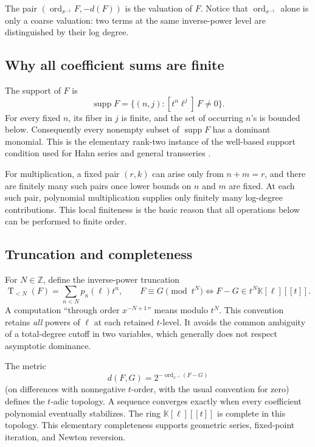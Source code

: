 \documentclass[11pt,oneside]{article}
\numberwithin{equation}{section}
\theoremstyle{definition}
\newcommand{\K}{\mathbb K}
\newcommand{\Z}{\mathbb Z}
\newcommand{\ordx}{\operatorname{ord}_{x^{-1}}}
\newcommand{\supp}{\operatorname{supp}}
\newcommand{\coeff}[2]{[#1]\,#2}
\newcommand{\trunc}[2]{\mathop{\mathrm{T}}_{<#1}\!\left(#2\right)}
\begin{document}
The pair \((\ordx F,-d(F))\) is the valuation of \(F\).  Notice that
\(\ordx\) alone is only a coarse valuation: two terms at the same inverse-power
level are distinguished by their log degree.

\subsection{Why all coefficient sums are finite}

The support of \(F\) is
\[
  \supp F=\{(n,j):\coeff{t^n\ell^j}{F}\ne0\}.
\]
For every fixed \(n\), its fiber in \(j\) is finite, and the set of occurring
\(n\)'s is bounded below.  Consequently every nonempty subset of \(\supp F\)
has a dominant monomial.  This is the elementary rank-two instance of the
well-based support condition used for Hahn series and general transseries
\cite{EdgarBeginners,Hahn1907}.

For multiplication, a fixed pair \((r,k)\) can arise only from
\(n+m=r\), and there are finitely many such pairs once lower bounds on \(n\) and
\(m\) are fixed.  At each such pair, polynomial multiplication supplies only
finitely many log-degree contributions.  This local finiteness is the basic
reason that all operations below can be performed to finite order.

\subsection{Truncation and completeness}

For \(N\in\Z\), define the inverse-power truncation
\begin{equation}\label{eq:truncation}
  \trunc{N}{F}=\sum_{n<N}p_n(\ell)t^n,
  \qquad F\equiv G\pmod{t^N}
  \Longleftrightarrow F-G\in t^N\K[\ell][[t]].
\end{equation}
A computation ``through order \(x^{-N+1}\)'' means modulo \(t^N\).
This convention retains \emph{all} powers of \(\ell\) at each retained
\(t\)-level.  It avoids the common ambiguity of a total-degree cutoff in two
variables, which generally does not respect asymptotic dominance.

The metric
\[
  d(F,G)=2^{-\ordx(F-G)}
\]
(on differences with nonnegative \(t\)-order, with the usual convention for
zero) defines the \(t\)-adic topology.  A sequence converges exactly when every
coefficient polynomial eventually stabilizes.  The ring
\(\K[\ell][[t]]\) is complete in this topology.  This elementary completeness
supports geometric series, fixed-point iteration, and Newton reversion.
\end{document}

